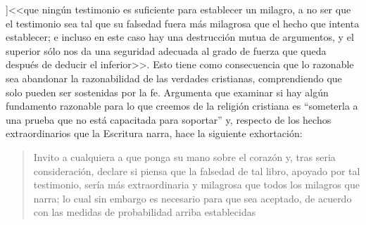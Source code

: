 ]{<<que ningún testimonio es suficiente para establecer un milagro, a no ser que el testimonio sea tal que su falsedad fuera más milagrosa que el hecho que intenta establecer; e incluso en este caso hay una destrucción mutua de argumentos, y el superior sólo nos da una seguridad adecuada al grado de fuerza que queda después de deducir el inferior>>}.
\label{subsec:humarg}
Esto tiene como consecuencia que lo razonable sea abandonar la razonabilidad de las verdades cristianas, comprendiendo que solo pueden ser sostenidas por la fe. Argumenta que examinar si hay algún fundamento razonable para lo que creemos de la religión cristiana es \enquote{someterla a una prueba que no está capacitada para soportar} y, respecto de los hechos extraordinarios que la Escritura narra, hace la siguiente exhortación: \blockquote[{\cite[\S10,2. 157-158]{hume1777enquiryes}}]{Invito a cualquiera a que ponga su mano sobre el corazón y, tras seria consideración, declare si piensa que la falsedad de tal libro, apoyado por tal testimonio, sería más extraordinaria y milagrosa que todos los milagros que narra; lo cual sin embargo es necesario para que sea aceptado, de acuerdo con las medidas de probabilidad arriba establecidas}.
